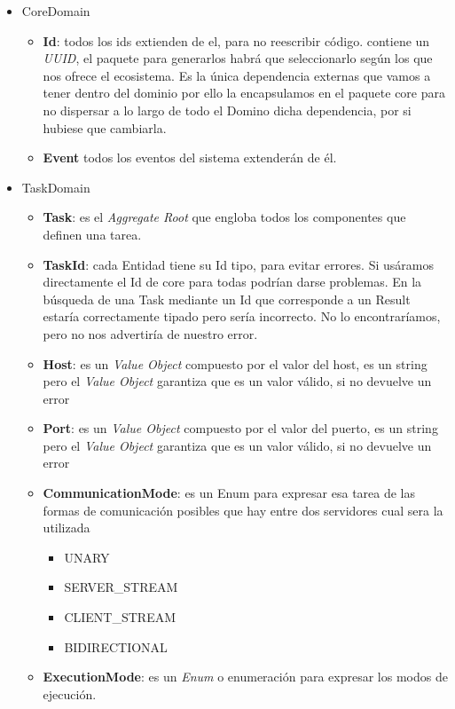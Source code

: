 \begin{itemize}
    \item CoreDomain
    \begin{itemize}
        \item \textbf{Id}: todos los ids extienden de el, para no reescribir código.
        contiene un \textit{UUID}, el paquete para generarlos habrá que seleccionarlo según los que nos ofrece el ecosistema.
        Es la única dependencia externas que vamos a tener dentro del dominio por ello la encapsulamos en el paquete core para no dispersar a lo largo de todo el Domino dicha dependencia, por si hubiese que cambiarla.
        \item \textbf{Event} todos los eventos del sistema extenderán de él.
    \end{itemize}
    \item TaskDomain
    \begin{itemize}
        \item \textbf{Task}: es el \textit{Aggregate Root} que engloba todos los componentes que definen una tarea.
        \item \textbf{TaskId}: cada Entidad tiene su Id tipo, para evitar errores.
        Si usáramos directamente el Id de core para todas podrían darse problemas.
        En la búsqueda de una Task mediante un Id que corresponde a un Result estaría correctamente tipado pero sería incorrecto.
        No lo encontraríamos, pero no nos advertiría de nuestro error.
        \item \textbf{Host}: es un \textit{Value Object} compuesto por el valor del host, es un string pero el \textit{Value Object} garantiza que es un valor válido, si no devuelve un error
        \item \textbf{Port}: es un \textit{Value Object} compuesto por el valor del puerto, es un string pero el \textit{Value Object} garantiza que es un valor válido, si no devuelve un error
        \item \textbf{CommunicationMode}: es un Enum para expresar esa tarea de las formas de comunicación posibles que hay entre dos servidores cual sera la utilizada
        \begin{itemize}
            \item UNARY
            \item SERVER\_STREAM
            \item CLIENT\_STREAM
            \item BIDIRECTIONAL
        \end{itemize}
        \item \textbf{ExecutionMode}: es un \textit{Enum} o enumeración para expresar los modos de ejecución.

\end{itemize}
\end{itemize}
